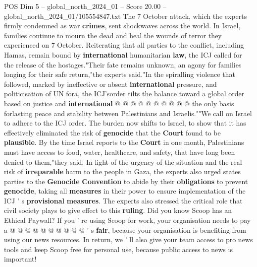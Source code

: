 \begin{textsample}{POS Dim 5 – global\_north\_2024\_01 – Score 20.00 – global\_north\_2024\_01/105554847.txt}
The 7 October attack, which the experts firmly condemned as war \textbf{crimes}, sent shockwaves across the world.
In Israel, families continue to mourn the dead and heal the wounds of terror they experienced on 7 October.
Reiterating that all parties to the conflict, including Hamas, remain bound by \textbf{international} humanitarian \textbf{law}, the ICJ called for the release of the hostages."Their fate remains unknown, an agony for families longing for their safe return,"the experts said."In the spiralling violence that followed, marked by ineffective or absent \textbf{international} pressure, and politicisation of UN fora, the ICJ'sorder tilts the balance toward a global order based on justice and \textbf{international} @ @ @ @ @ @ @ @ @ @ the only basis forlasting peace and stability between Palestinians and Israelis.""We call on Israel to adhere to the ICJ order.
The burden now shifts to Israel, to show that it has effectively eliminated the risk of \textbf{genocide} that the \textbf{Court} found to be \textbf{plausible}.
By the time Israel reports to the \textbf{Court} in one month, Palestinians must have access to food, water, healthcare, and safety, that have long been denied to them,"they said.
In light of the urgency of the situation and the real risk of \textbf{irreparable} harm to the people in Gaza, the experts also urged states parties to the \textbf{Genocide} \textbf{Convention} to abide by their \textbf{obligations} to prevent \textbf{genocide}, taking all \textbf{measures} in their power to ensure implementation of the ICJ ' s \textbf{provisional} \textbf{measures}.
The experts also stressed the critical role that civil society plays to give effect to this \textbf{ruling}.
Did you know Scoop has an Ethical Paywall?
If you ' re using Scoop for work, your organisation needs to pay a @ @ @ @ @ @ @ @ @ @ ' s \textbf{fair}, because your organisation is benefiting from using our news resources.
In return, we ' ll also give your team access to pro news tools and keep Scoop free for personal use, because public access to news is important!

\end{textsample}
